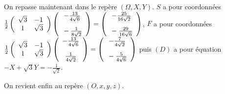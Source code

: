 {{On repasse maintenant dans le repère $(\Omega,X,Y)$. $S$ a pour coordonnées $\frac{1}{2}\left(
\begin{array}{cc}
\sqrt{3}&-1\\
1&\sqrt{3}
\end{array}
\right)\left(
\begin{array}{c}
-\frac{13}{4\sqrt{6}}\\
\rule{0mm}{6mm}-\frac{1}{8\sqrt{2}}
\end{array}\right)=\left(
\begin{array}{c}
-\frac{25}{16\sqrt{2}}\\
\rule{0mm}{6mm}-\frac{29}{16\sqrt{6}}
\end{array}\right)$, $F$ a pour coordonnées $\frac{1}{2}\left(
\begin{array}{cc}
\sqrt{3}&-1\\
1&\sqrt{3}
\end{array}
\right)\left(
\begin{array}{c}
-\frac{13}{4\sqrt{6}}\\
\rule{0mm}{6mm}\frac{1}{4\sqrt{2}}
\end{array}\right)=\left(
\begin{array}{c}
-\frac{7}{4\sqrt{2}}\\
\rule{0mm}{6mm}-\frac{5}{4\sqrt{6}}
\end{array}\right)$  
puis $(D)$ a pour équation $-X+\sqrt{3}Y=-\frac{1}{\sqrt{2}}$.

On revient enfin au repère $(O,x,y,z)$.

}}
